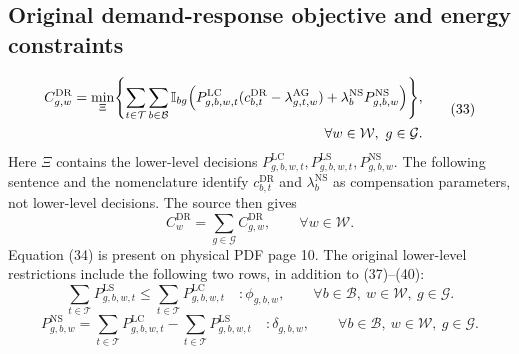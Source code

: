\documentclass{article}
\begin{document}
\subsection*{Original demand-response objective and energy constraints}
\begin{equation}
\begin{aligned}
C^{\mathrm{DR}}_{g,w}=\min_{\Xi}\Biggl\{
\sum_{t\in\mathcal T}\sum_{b\in\mathcal B}\mathbb I_{bg}
\Bigl(P^{\mathrm{LC}}_{g,b,w,t}(c^{\mathrm{DR}}_{b,t}-\lambda^{\mathrm{AG}}_{g,t,w})
+\lambda_b^{\mathrm{NS}}P^{\mathrm{NS}}_{g,b,w}\Bigr)\Biggr\},\\
\forall w\in\mathcal W,\ g\in\mathcal G.
\end{aligned}\tag{33}
\end{equation}
Here \(\Xi\) contains the lower-level decisions \(P^{\mathrm{LC}}_{g,b,w,t},P^{\mathrm{LS}}_{g,b,w,t},P^{\mathrm{NS}}_{g,b,w}\). The following sentence and the nomenclature identify \(c^{\mathrm{DR}}_{b,t}\) and \(\lambda_b^{\mathrm{NS}}\) as compensation parameters, not lower-level decisions. The source then gives
\begin{equation}
C^{\mathrm{DR}}_w=\sum_{g\in\mathcal G}C^{\mathrm{DR}}_{g,w},
\qquad\forall w\in\mathcal W.
\tag{34}
\end{equation}
Equation (34) is present on physical PDF page 10. The original lower-level restrictions include the following two rows, in addition to (37)--(40):
\begin{equation}
\sum_{t\in\mathcal T}P^{\mathrm{LS}}_{g,b,w,t}
\leq\sum_{t\in\mathcal T}P^{\mathrm{LC}}_{g,b,w,t}
\quad:\phi_{g,b,w},
\qquad\forall b\in\mathcal B,\ w\in\mathcal W,\ g\in\mathcal G.
\tag{35}
\end{equation}
\begin{equation}
P^{\mathrm{NS}}_{g,b,w}
=\sum_{t\in\mathcal T}P^{\mathrm{LC}}_{g,b,w,t}
-\sum_{t\in\mathcal T}P^{\mathrm{LS}}_{g,b,w,t}
\quad:\delta_{g,b,w},
\qquad\forall b\in\mathcal B,\ w\in\mathcal W,\ g\in\mathcal G.
\tag{36}
\end{equation}
\end{document}
